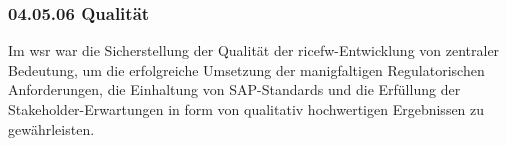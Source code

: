 \subsubsection*{04.05.06 Qualität} 
\label{sec:04.05.06.Qualitaet}

\par Im \gls{wsr} war die Sicherstellung der Qualität der \gls{ricefw}-Entwicklung von zentraler Bedeutung, um die erfolgreiche Umsetzung der manigfaltigen Regulatorischen Anforderungen, die Einhaltung von SAP-Standards und die Erfüllung der Stakeholder-Erwartungen in form von qualitativ hochwertigen Ergebnissen zu gewährleisten. 